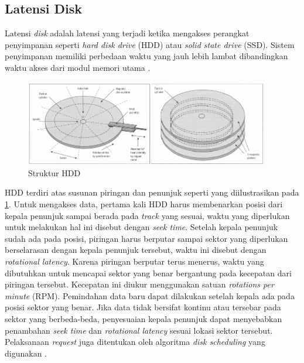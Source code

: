 \subsection{Latensi Disk}
\label{sec:latensi-disk}

Latensi \textit{disk} adalah latensi yang terjadi ketika mengakses perangkat penyimpanan seperti \textit{hard disk drive} (HDD) atau \textit{solid state drive} (SSD). Sistem penyimpanan memiliki perbedaan waktu yang jauh lebih lambat dibandingkan waktu akses dari modul memori utama \parencite{ng1991improving}.

\begin{figure}[ht]
  \centering
  \includegraphics[width=0.95\textwidth]{resources/chapter-2/disk-structure.png}
  \caption{Struktur HDD \parencite{sammes2000disk}}
  \label{fig:hdd-structure}
\end{figure}


HDD terdiri atas susunan piringan dan penunjuk seperti yang diilustrasikan pada \ref{fig:hdd-structure}. Untuk mengakses data, pertama kali HDD harus membenarkan posisi dari kepala penunjuk sampai berada pada \textit{track} yang sesuai, waktu yang diperlukan untuk melakukan hal ini disebut dengan \textit{seek time}. Setelah kepala penunjuk sudah ada pada posisi, piringan harus berputar sampai sektor yang diperlukan berselarasan dengan kepala penunjuk tersebut, waktu ini disebut dengan \textit{rotational latency}. Karena piringan berputar terus menerus, waktu yang dibutuhkan untuk mencapai sektor yang benar bergantung pada kecepatan dari piringan tersebut. Kecepatan ini diukur menggunakan satuan \textit{rotations per minute} (RPM). Pemindahan data baru dapat dilakukan setelah kepala ada pada posisi sektor yang benar. Jika data tidak bersifat kontinu atau tersebar pada sektor yang berbeda-beda, penyesuaian kepala penunjuk dapat menyebabkan penambahan \textit{seek time} dan \textit{rotational latency} sesuai lokasi sektor tersebut. Pelaksanaan \textit{request} juga ditentukan oleh algoritma \textit{disk scheduling} yang digunakan \parencite{arpaci2018operating}.

